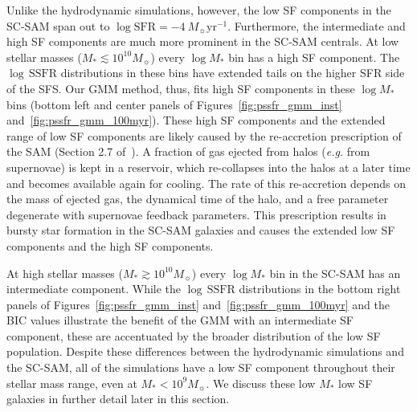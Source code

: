 \documentclass[tighten, preprint]{aastex62}
\begin{document}
Unlike the hydrodynamic simulations, however, the low SF components in the 
SC-SAM span out to $\log\mathrm{SFR}{=}{-}4\ M_\sun \mathrm{yr}^{-1}$. 
Furthermore, the intermediate 
and high SF components are much more prominent in the SC-SAM centrals. 
At low stellar masses ($M_* \lesssim 10^{10}M_\sun$) every $\log M_*$ 
bin has a high SF component. The $\log\,\mathrm{SSFR}$ distributions in these 
bins have extended tails on the higher SFR side of the SFS. Our GMM 
method, thus, fits high SF components in these $\log M_*$ bins (bottom left 
and center panels of Figures~\ref{fig:pssfr_gmm_inst} and~\ref{fig:pssfr_gmm_100myr}). 
These high SF components and the extended range of low SF components are likely 
caused by the re-accretion prescription of the SAM (Section 2.7 of~\citealt{somerville2008a}).
A fraction of gas ejected from halos (\emph{e.g.} from supernovae) is kept in 
a reservoir, which re-collapses into the halos at a later time and becomes available 
again for cooling. The rate of this re-accretion depends on the mass of ejected gas, 
the dynamical time of the halo, and a free parameter degenerate with supernovae 
feedback parameters. This prescription results in bursty 
star formation in the SC-SAM galaxies and causes the extended low SF components and 
the high SF components. %


At high stellar masses ($M_* \gtrsim 10^{10}M_\sun$) every $\log M_*$ bin in the 
SC-SAM has an intermediate component. While the $\log\,\mathrm{SSFR}$ 
distributions in the bottom right panels of Figures~\ref{fig:pssfr_gmm_inst} 
and~\ref{fig:pssfr_gmm_100myr} and the BIC values illustrate the benefit of the 
GMM with an intermediate SF component, these are accentuated by the broader 
distribution of the low SF population. Despite these differences between the 
hydrodynamic simulations and the SC-SAM, all of the simulations have a low SF 
component throughout their stellar mass 
range, even at $M_* < 10^9M_\sun$. We discuss these low $M_*$ low SF galaxies 
in further detail later in this section.
\end{document}
